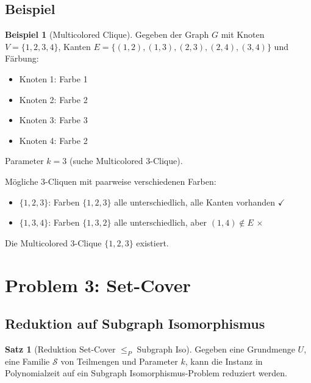 ﻿\documentclass[a4paper,12pt]{article}
\theoremstyle{definition}
\newtheorem{beispiel}{Beispiel}[section]
\newtheorem{satz}{Satz}[section]
\begin{document}
\subsection{Beispiel}

\begin{beispiel}[Multicolored Clique]
	Gegeben der Graph $G$ mit Knoten $V = \{1, 2, 3, 4\}$, Kanten $E = \{(1,2), (1,3), (2,3), (2,4), (3,4)\}$ und Färbung:
	\begin{itemize}
		\item Knoten 1: Farbe 1
		\item Knoten 2: Farbe 2
		\item Knoten 3: Farbe 3
		\item Knoten 4: Farbe 2
	\end{itemize}
	
	Parameter $k = 3$ (suche Multicolored 3-Clique).
	
	Mögliche 3-Cliquen mit paarweise verschiedenen Farben:
	\begin{itemize}
		\item $\{1, 2, 3\}$: Farben $\{1, 2, 3\}$ alle unterschiedlich, alle Kanten vorhanden $\checkmark$
		\item $\{1, 3, 4\}$: Farben $\{1, 3, 2\}$ alle unterschiedlich, aber $(1, 4) \notin E$ $\times$
	\end{itemize}
	
	Die Multicolored 3-Clique $\{1, 2, 3\}$ existiert.
\end{beispiel}

\section{Problem 3: Set-Cover}

\subsection{Reduktion auf Subgraph Isomorphismus}

\begin{satz}[Reduktion Set-Cover $\leq_P$ Subgraph Iso]
	Gegeben eine Grundmenge $U$, eine Familie $\mathcal{S}$ von Teilmengen und Parameter $k$, kann die Instanz in Polynomialzeit auf ein Subgraph Isomorphismus-Problem reduziert werden.
\end{satz}
\end{document}
